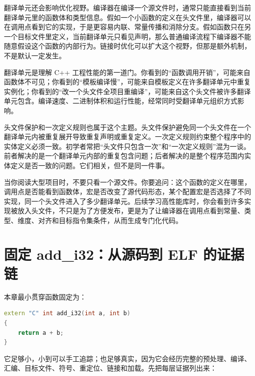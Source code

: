 翻译单元还会影响优化视野。编译器在编译一个源文件时，通常只能直接看到当前翻译单元里的函数体和类型信息。假如一个小函数的定义在头文件里，编译器可以在调用点看到它的实现，于是更容易内联、常量传播和消除分支。假如函数只在另一个目标文件里定义，当前翻译单元只看见声明，那么普通编译流程下编译器不能随意假设这个函数的内部行为。链接时优化可以扩大这个视野，但那是额外机制，不是默认一定发生。

\begin{deepdive}
翻译单元是理解 C++ 工程性能的第一道门。你看到的“函数调用开销”，可能来自函数体不可见；你看到的“模板编译慢”，可能来自模板定义在许多翻译单元中重复实例化；你看到的“改一个头文件全项目重编译”，可能来自这个头文件被许多翻译单元包含。编译速度、二进制体积和运行性能，经常同时受翻译单元组织方式影响。
\end{deepdive}

头文件保护和一次定义规则也属于这个主题。头文件保护避免同一个头文件在一个翻译单元内被重复展开导致重复声明或重复定义。一次定义规则约束整个程序中的实体定义必须一致。初学者常把“头文件只包含一次”和“一次定义规则”混为一谈。前者解决的是一个翻译单元内部的重复包含问题；后者解决的是整个程序范围内实体定义是否一致的问题。它们相关，但不是同一件事。

当你阅读大型项目时，不要只看一个源文件。你要追问：这个函数的定义在哪里，调用点是否能看到函数体，宏是否改变了源代码形态，某个配置宏是否选择了不同实现，同一个头文件进入了多少翻译单元。后续学习高性能库时，你会看到许多实现被放入头文件，不只是为了方便发布，更是为了让编译器在调用点看到常量、类型、维度、对齐和目标指令集条件，从而生成专门化代码。

\section{固定 add\_i32：从源码到 ELF 的证据链}

本章最小贯穿函数固定为：

\begin{lstlisting}[language=C++,caption={贯穿本章的最小函数}]
extern "C" int add_i32(int a, int b)
{
    return a + b;
}
\end{lstlisting}

它足够小，小到可以手工追踪；也足够真实，因为它会经历完整的预处理、编译、汇编、目标文件、符号、重定位、链接和加载。先把每层证据列出来：


